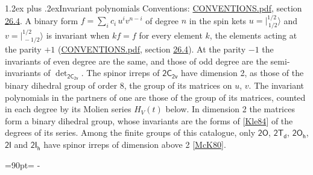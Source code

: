 \documentclass[10pt,a4paper]{article}
\makeatletter
\renewcommand\section{\@startsection{section}{1}{\z@}{-3ex plus -1ex minus -.2ex}%
  {1.2ex plus .2ex}{\normalfont\large\sffamily\bfseries\color{parttitle}}}
\newcommand{\needspace}[1]{\par\penalty-100\begingroup\dimen0=#1\relax\dimen2=\pagegoal
  \advance\dimen2-\pagetotal\ifdim\dimen0>\dimen2\relax\ifdim\dimen2>0pt\vfil\break\fi\fi
  \endgroup}
\numberwithin{equation}{section}
\newcommand{\grp}[1]{\mathsf{#1}}
\newcommand{\jm}[2]{\bigl\lvert{}^{#1}_{\,#2}\bigr\rangle}
\makeatother
\begin{document}
\section{Invariant polynomials}\label{s:invariants}
Conventions: \href{../../CONVENTIONS.pdf}{CONVENTIONS.pdf}, section \href{../../CONVENTIONS.pdf\#conv.26.4}{26.4}.
\leavevmode\label{n:local.binary.form}A binary form $f = \sum_i c_i\, u^i v^{n-i}$ of degree $n$ in the spin kets $u = \jm{1/2}{1/2}$ and $v = \jm{1/2}{-1/2}$ is invariant when $k f = f$ for every element $k$, the elements acting at the parity $+1$ (\href{../../CONVENTIONS.pdf}{CONVENTIONS.pdf}, section \href{../../CONVENTIONS.pdf\#conv.26.4}{26.4}). At the parity $-1$ the invariants of even degree are the same, and those of odd degree are the semi-invariants of $\det_{\grp{2C_{2v}}}$.
The spinor irreps of $\grp{2C_{2v}}$ have dimension 2, as those of the binary dihedral group of order 8, the group of its matrices on $u$, $v$. \label{n:function.hilbert}The invariant polynomials in the partners of one are those of the group of its matrices, counted in each degree by its Molien series $H_V(t)$ below. In dimension 2 the matrices form a binary dihedral group, whose invariants are the forms of [\href{../../../REFERENCES.pdf\#ref.Kle84}{Kle84}] of the degrees of its series. Among the finite groups of this catalogue, only $\grp{2O}$, $\grp{2T_{d}}$, $\grp{2O_{h}}$, $\grp{2I}$ and $\grp{2I_{h}}$ have spinor irreps of dimension above 2 [\href{../../../REFERENCES.pdf\#ref.McK80}{McK80}].
\needspace{90pt}
\end{document}
